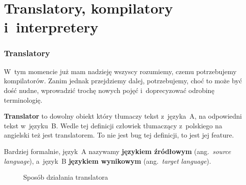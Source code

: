 \documentclass[10pt,t]{beamer}
\begin{document}










\section{Translatory, kompilatory i~interpretery}



\begin{frame}
  \frametitle{Translatory}


  W~tym momencie już mam nadzieję wszyscy rozumiemy, czemu potrzebujemy
  kompilatorów. Zanim jednak przejdziemy dalej, potrzebujemy, choć to może
  być dość nudne, wprowadzić trochę nowych pojęć i~doprecyzować odrobinę
  terminologię.

  \textbf{Translator} to dowolny obiekt który tłumaczy tekst z~języka~A,
  na odpowiedni tekst w~języku~B. Wedle tej definicji człowiek tłumaczący
  z~polskiego na angielski też jest translatorem. To nie jest bug tej
  definicji, to jest jej feature.

  Bardziej formalnie, język~A nazywamy \textbf{językiem źródłowym}
  (ang.~\textit{source language}), a~język~B \textbf{językiem wynikowym}
  (ang.~\textit{target language}).





  \begin{figure}

    \label{fig:Translator-01}



    \caption{Sposób działania translatora}


  \end{figure}

\end{frame}
\end{document}

